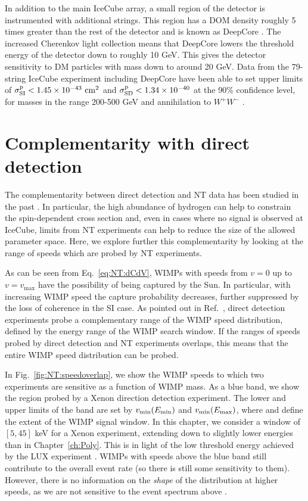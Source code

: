 In addition to the main IceCube array, a small region of the detector is instrumented with additional strings. This region has a DOM density roughly 5 times greater than the rest of the detector and is known as DeepCore \cite{Abbasi:2012}. The increased Cherenkov light collection means that DeepCore lowers the threshold energy of the detector down to roughly 10 GeV. This gives the detector sensitivity to DM particles with mass down to around 20 GeV. Data from the 79-string IceCube experiment including DeepCore have been able to set upper limits of $\sigmapsi < 1.45 \times 10^{-43} \cmsq$ and $\sigmapsd < 1.34 \times 10^{-40}$ at the 90\% confidence level, for masses in the range 200-500 GeV and annihilation to $W^{+}W^{-}$ \cite{Aartsen:2013c}.


\section{Complementarity with direct detection}
\label{sec:NT:complementarity}
The complementarity between direct detection and NT data has been studied in the past \cite{Arina:2013}. In particular, the high abundance of hydrogen can help to constrain the spin-dependent cross section and, even in cases where no signal is observed at IceCube, limits from NT experiments can help to reduce the size of the allowed parameter space. Here, we explore further this complementarity by looking at the range of speeds which are probed by NT experiments.

As can be seen from Eq.~\ref{eq:NT:dCdV}, WIMPs with speeds from $v=0$ up to $v=v_\textrm{max}$ have the possibility of being captured by the Sun. In particular, with increasing WIMP speed the capture probability decreases, further suppressed by the loss of coherence in the SI case. As pointed out in Ref.~\cite{Choi:2014}, direct detection experiments probe a complementary range of the WIMP speed distribution, defined by the energy range of the WIMP search window. If the ranges of speeds probed by direct detection and NT experiments overlaps, this means that the entire WIMP speed distribution can be probed.

In Fig.~\ref{fig:NT:speedoverlap}, we show the WIMP speeds to which two experiments are sensitive as a function of WIMP mass. As a blue band, we show the region probed by a Xenon direction detection experiment. The lower and upper limits of the band are set by $v_\textrm{min}(\Emin)$ and $v_\textrm{min}(\Emax)$, where \Emin and \Emax define the extent of the WIMP signal window. In this chapter, we consider a window of $[5,45]$ keV for a Xenon experiment, extending down to slightly lower energies than in Chapter~\ref{ch:Poly}. This is in light of the low threshold energy achieved by the LUX experiment \cite{Akerib:2014}. WIMPs with speeds above the blue band still contribute to the overall event rate (so there is still some sensitivity to them). However, there is no information on the \textit{shape} of the distribution at higher speeds, as we are not sensitive to the event spectrum above \Emax.


